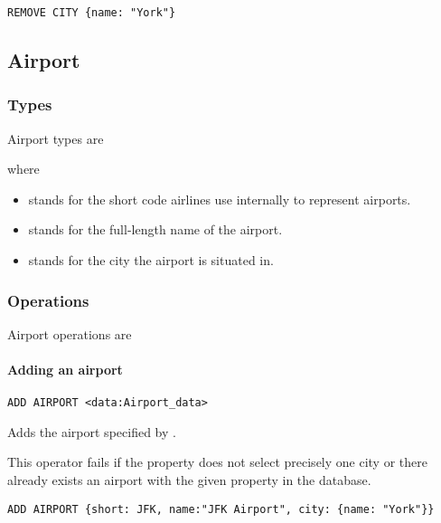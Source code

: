 \begin{texa}
  \lstinline|REMOVE CITY {name: "York"}|
\end{texa}


\subsection{Airport}
\subsubsection{Types}
Airport types are
\begin{description}
  \item[] 
  \item[] 
\end{description}
where
\begin{itemize}
  \item {} stands for the short code airlines use internally to
    represent airports.
  \item {} stands for the full-length name of the airport.
  \item {} stands for the city the airport is situated in.
\end{itemize}
\subsubsection{Operations}
Airport operations are
\paragraph{Adding an airport}
\begin{operation}
  \lstinline{ADD AIRPORT <data:Airport_data>}
  \label{op:add_airport}
\end{operation}
Adds the airport specified by .

This operator fails if the  property does not select
precisely one city or there already exists an airport with the given
 property in the database.

\begin{texa}
  \lstinline|ADD AIRPORT {short: JFK, name:"JFK Airport", city: {name: "York"}}|
\end{texa}

